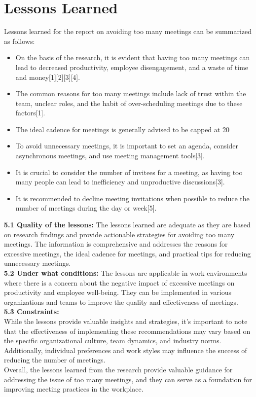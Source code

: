 \section{Lessons Learned}
Lessons learned for the report on avoiding too many meetings can be summarized as follows:
\begin{itemize}[noitemsep]
\item On the basis of the research, it is evident that having too many meetings can lead to decreased productivity, employee disengagement, and a waste of time and money[1][2][3][4].
\item The common reasons for too many meetings include lack of trust within the team, unclear roles, and the habit of over-scheduling meetings due to these factors[1].
\item The ideal cadence for meetings is generally advised to be capped at 20%
\item To avoid unnecessary meetings, it is important to set an agenda, consider asynchronous meetings, and use meeting management tools[3].
\item It is crucial to consider the number of invitees for a meeting, as having too many people can lead to inefficiency and unproductive discussions[3].
\item It is recommended to decline meeting invitations when possible to reduce the number of meetings during the day or week[5].
     \end{itemize}

{\bf 5.1 Quality of the lessons:}
The lessons learned are adequate as they are based on research findings and provide actionable strategies for avoiding too many meetings. The information is comprehensive and addresses the reasons for excessive meetings, the ideal cadence for meetings, and practical tips for reducing unnecessary meetings.\\

{\bf 5.2 Under what conditions:}
The lessons are applicable in work environments where there is a concern about the negative impact of excessive meetings on productivity and employee well-being. They can be implemented in various organizations and teams to improve the quality and effectiveness of meetings.\\

{\bf 5.3 Constraints:}\\
While the lessons provide valuable insights and strategies, it's important to note that the effectiveness of implementing these recommendations may vary based on the specific organizational culture, team dynamics, and industry norms. Additionally, individual preferences and work styles may influence the success of reducing the number of meetings.\\
Overall, the lessons learned from the research provide valuable guidance for addressing the issue of too many meetings, and they can serve as a foundation for improving meeting practices in the workplace.
\newpage
